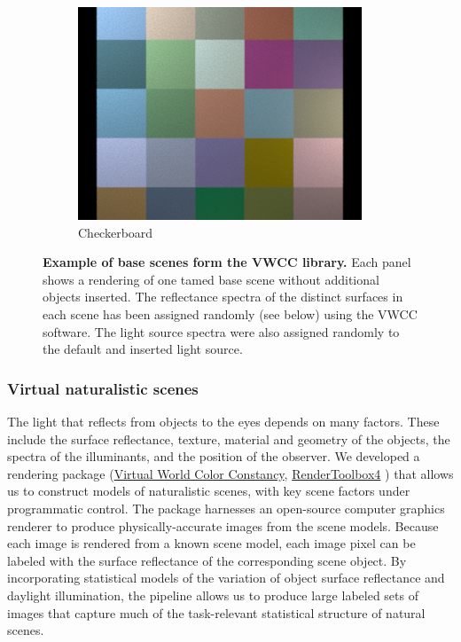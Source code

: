\documentclass{jov}
\begin{document}
\begin{figure}[t]
\begin{subfigure}[b]{0.22 \textwidth}
        \includegraphics[width=\textwidth]{../Figures/Figure3/Figure3_f.png}
        \caption{Checkerboard}
        \label{fig:baseSceneCheckerBoard}
    \end{subfigure}
    \caption{{\bf Example of base scenes form the VWCC library.} Each panel shows a rendering of one tamed base scene without additional objects inserted.  The reflectance spectra of the distinct surfaces in each scene has been assigned randomly (see below) using the VWCC software.  The light source spectra were also assigned randomly to the default and inserted light source.}\label{fig:baseScenes}
\end{figure}

\subsubsection{Virtual naturalistic scenes}

The light that reflects from objects to the eyes depends on many factors.
These include the surface reflectance, texture, material and geometry of the objects, the spectra of the illuminants, and the position of the observer.
We developed a rendering package (\href{https://github.com/BrainardLab/VirtualWorldColorConstancy}{Virtual World Color Constancy}, \href{http://rendertoolbox.org}{RenderToolbox4} \cite{heasly2014rendertoolbox3}) that allows us to construct models of naturalistic scenes, with key scene factors under programmatic control.
The package harnesses an open-source computer graphics renderer  \cite{jakob2015mitsuba} to produce physically-accurate images from the scene models.
Because each image is rendered from a known scene model, each image pixel can be labeled with the surface reflectance of the corresponding scene object.
By incorporating statistical models of the variation of object surface reflectance and daylight illumination, the pipeline allows us to produce large labeled sets of images that capture much of the task-relevant statistical structure of natural scenes.
\end{document}
